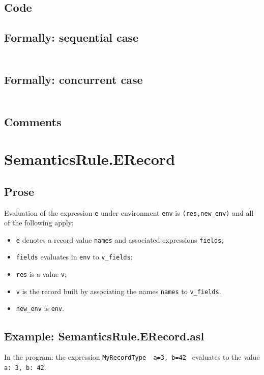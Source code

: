 \documentclass{book}
\begin{document}
  \subsection{Code}


  \subsection{Formally: sequential case}
  \begin{align}
  \end{align} 

  \subsection{Formally: concurrent case}
  \begin{align}
  \end{align} 

  \subsection{Comments}

\section{SemanticsRule.ERecord \label{sec:SemanticsRule.ERecord}}

  \subsection{Prose}
  Evaluation of the expression \texttt{e} under environment \texttt{env} is
  \texttt{(res,new\_env)} and all of the following apply:
  \begin{itemize}
  \item \texttt{e} denotes a record value \texttt{names} and associated expressions
    \texttt{fields};
  \item \texttt{fields} evaluates in \texttt{env} to \texttt{v\_fields};
  \item \texttt{res} is a value \texttt{v};
  \item \texttt{v} is the record built by associating the names \texttt{names} to \texttt{v\_fields}.
  \item \texttt{new\_env} is \texttt{env}.
  \end{itemize}

  \subsection{Example: SemanticsRule.ERecord.asl}
    In the program:
    the expression \texttt{MyRecordType { a=3, b=42 }} evaluates to the value \texttt{{a:
3, b: 42}}.
\end{document}
